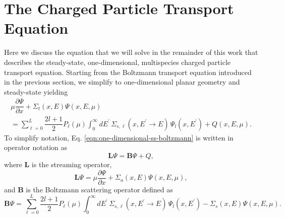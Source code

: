 \section{The Charged Particle Transport Equation}
Here we discuss the equation that we will solve in the remainder of this work that describes the steady-state, one-dimensional, multispecies charged particle transport equation. Starting from the Boltzmann transport equation introduced in the previous section, we simplify to one-dimensional planar geometry and steady-state yielding
\begin{multline} \label{eqn:one-dimensional-ss-boltzmann}
  \mu \dfrac{\partial \Psi}{\partial x} + \Sigma_t(x,E) \Psi(x,E,\mu) \\ = \sum_{\ell = 0}^L \dfrac{2l+1}{2} P_{\ell}(\mu) \int_{0}^{\infty} dE^{\prime} \, \Sigma_{s,\ell}(x, E^{\prime}\rightarrow E) \, \Psi_l(x,E^{\prime}) + Q(x,E,\mu).
\end{multline} 
To simplify notation, Eq. \eqref{eqn:one-dimensional-ss-boltzmann} is written in operator notation as
\begin{equation} \label{eqn:one-dimensional-ss-boltzmann-equation}
  \boldsymbol{L} \Psi = \boldsymbol{B} \Psi + Q,
\end{equation}
where $\boldsymbol{L}$ is the streaming operator,
\begin{equation} \label{eqn:1D-ss-absorption-operator}
  \boldsymbol{L} \Psi = \mu \dfrac{\partial \Psi}{\partial x} + \Sigma_a(x,E) \Psi(x,E,\mu),
\end{equation}
and $\boldsymbol{B}$ is the Boltzmann scattering operator defined as
\begin{equation} \label{eqn:1D-ss-boltzamnn-operator}
  \boldsymbol{B} \Psi = \sum_{\ell = 0}^L \dfrac{2l+1}{2} P_{\ell}(\mu) \int_{0}^{\infty} dE^{\prime} \, \Sigma_{s,\ell}(x, E^{\prime}\rightarrow E) \, \Psi_l(x,E^{\prime}) - \Sigma_s(x,E) \Psi(x,E,\mu).
\end{equation}

